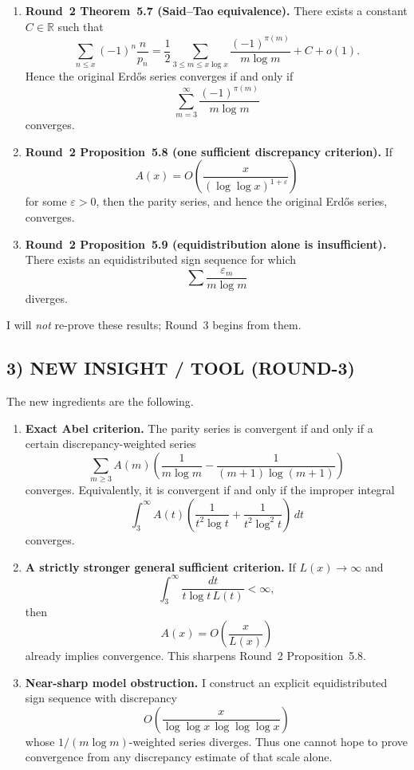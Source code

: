 \begin{enumerate}
\item \textbf{Round~2 Theorem~5.7 (Said--Tao equivalence).}
There exists a constant \(C\in\mathbb R\) such that
\[
\sum_{n\le x} (-1)^n \frac{n}{p_n}
=
\frac12 \sum_{3\le m\le x\log x} \frac{(-1)^{\pi(m)}}{m\log m}
+ C + o(1).
\]
Hence the original Erd\H{o}s series converges if and only if
\[
\sum_{m=3}^\infty \frac{(-1)^{\pi(m)}}{m\log m}
\]
converges.

\item \textbf{Round~2 Proposition~5.8 (one sufficient discrepancy criterion).}
If
\[
A(x)=O\!\left(\frac{x}{(\log\log x)^{1+\varepsilon}}\right)
\]
for some \(\varepsilon>0\), then the parity series, and hence the original Erd\H{o}s series, converges.

\item \textbf{Round~2 Proposition~5.9 (equidistribution alone is insufficient).}
There exists an equidistributed sign sequence for which
\[
\sum \frac{\varepsilon_m}{m\log m}
\]
diverges.
\end{enumerate}

I will \emph{not} re-prove these results; Round~3 begins from them.

\subsection*{3) NEW INSIGHT / TOOL (ROUND-3)}

The new ingredients are the following.

\begin{enumerate}
\item \textbf{Exact Abel criterion.}
The parity series is convergent if and only if a certain discrepancy-weighted series
\[
\sum_{m\ge 3} A(m)\left(\frac1{m\log m}-\frac1{(m+1)\log(m+1)}\right)
\]
converges. Equivalently, it is convergent if and only if the improper integral
\[
\int_3^\infty A(t)\left(\frac{1}{t^2\log t}+\frac{1}{t^2\log^2 t}\right)\,dt
\]
converges.

\item \textbf{A strictly stronger general sufficient criterion.}
If \(L(x)\to\infty\) and
\[
\int_3^\infty \frac{dt}{t\log t\,L(t)}<\infty,
\]
then
\[
A(x)=O\!\left(\frac{x}{L(x)}\right)
\]
already implies convergence.
This sharpens Round~2 Proposition~5.8.

\item \textbf{Near-sharp model obstruction.}
I construct an explicit equidistributed sign sequence with discrepancy
\[
O\!\left(\frac{x}{\log\log x\,\log\log\log x}\right)
\]
whose \(1/(m\log m)\)-weighted series diverges.
Thus one cannot hope to prove convergence from any discrepancy estimate of that scale alone.
\end{enumerate}

